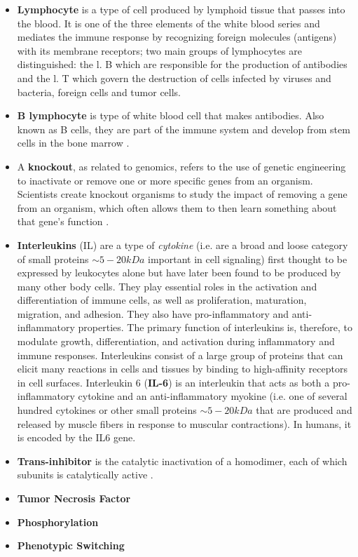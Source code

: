 \documentclass[12pt,a4paper]{report}
\begin{document}
\begin{appendices}
\begin{itemize}
   \item \textbf{Lymphocyte} is a type of cell produced by lymphoid tissue that passes into the blood. It is one of the three elements of the white blood series and mediates the immune response by recognizing foreign molecules (antigens) with its membrane receptors; two main groups of lymphocytes are distinguished: the l. B which are responsible for the production of antibodies and the l. T which govern the destruction of cells infected by viruses and bacteria, foreign cells and tumor cells.
   \item \textbf{B lymphocyte} is type of white blood cell that makes antibodies. Also known as B cells, they are part of the immune system and develop from stem cells in the bone marrow \cite{NIHBCells}.
   \item A \textbf{knockout}, as related to genomics, refers to the use of genetic engineering to inactivate or remove one or more specific genes from an organism. Scientists create knockout organisms to study the impact of removing a gene from an organism, which often allows them to then learn something about that gene's function \cite{knockout}.
   \item \textbf{Interleukins} (IL) are a type of \emph{cytokine} (i.e. are a broad and loose category of small proteins $\sim5-20 kDa$ important in cell signaling) first thought to be expressed by leukocytes alone but have later been found to be produced by many other body cells. They play essential roles in the activation and differentiation of immune cells, as well as proliferation, maturation, migration, and adhesion. They also have pro-inflammatory and anti-inflammatory properties. The primary function of interleukins is, therefore, to modulate growth, differentiation, and activation during inflammatory and immune responses. Interleukins consist of a large group of proteins that can elicit many reactions in cells and tissues by binding to high-affinity receptors in cell surfaces. Interleukin 6 (\textbf{IL-6}) is an interleukin that acts as both a pro-inflammatory cytokine and an anti-inflammatory myokine (i.e. one of several hundred cytokines or other small proteins $\sim5-20 kDa$ that are produced and released by muscle fibers in response to muscular contractions). In humans, it is encoded by the IL6 gene.
   
   \item \textbf{Trans-inhibitor} is the catalytic inactivation of a homodimer, each of which subunits is catalytically active \cite{transinhibitorwikipedia}.
   
   \item \textbf{Tumor Necrosis Factor}
   
   \item \textbf{Phosphorylation}
   
   \item \textbf{Phenotypic Switching}
  
  \end{itemize}
\clearpage
\end{appendices}
\end{document}
